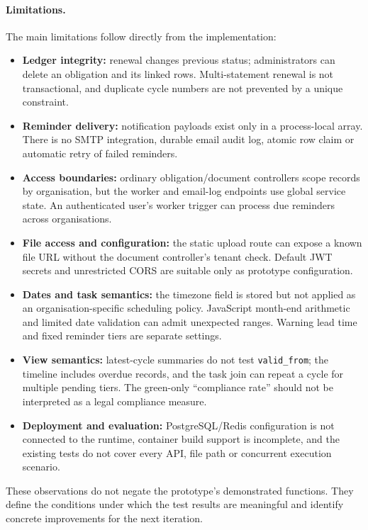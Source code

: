 \paragraph{Limitations.}
The main limitations follow directly from the implementation:
\begin{itemize}
\item \textbf{Ledger integrity:} renewal changes previous status; administrators can delete an obligation and its linked rows. Multi-statement renewal is not transactional, and duplicate cycle numbers are not prevented by a unique constraint.
\item \textbf{Reminder delivery:} notification payloads exist only in a process-local array. There is no SMTP integration, durable email audit log, atomic row claim or automatic retry of failed reminders.
\item \textbf{Access boundaries:} ordinary obligation/document controllers scope records by organisation, but the worker and email-log endpoints use global service state. An authenticated user's worker trigger can process due reminders across organisations.
\item \textbf{File access and configuration:} the static upload route can expose a known file URL without the document controller's tenant check. Default JWT secrets and unrestricted CORS are suitable only as prototype configuration.
\item \textbf{Dates and task semantics:} the timezone field is stored but not applied as an organisation-specific scheduling policy. JavaScript month-end arithmetic and limited date validation can admit unexpected ranges. Warning lead time and fixed reminder tiers are separate settings.
\item \textbf{View semantics:} latest-cycle summaries do not test \texttt{valid\_from}; the timeline includes overdue records, and the task join can repeat a cycle for multiple pending tiers. The green-only ``compliance rate'' should not be interpreted as a legal compliance measure.
\item \textbf{Deployment and evaluation:} PostgreSQL/Redis configuration is not connected to the runtime, container build support is incomplete, and the existing tests do not cover every API, file path or concurrent execution scenario.
\end{itemize}

These observations do not negate the prototype's demonstrated functions. They define the conditions under which the test results are meaningful and identify concrete improvements for the next iteration.
